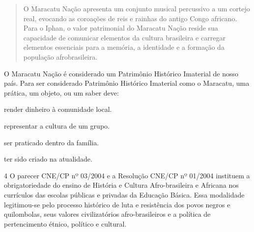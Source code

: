 \begin{quote}
O Maracatu Nação apresenta um conjunto musical percussivo a um cortejo
real, evocando as coroações de reis e rainhas do antigo Congo africano.
Para o Iphan, o valor patrimonial do Maracatu Nação reside sua
capacidade de comunicar elementos da cultura brasileira e carregar
elementos essenciais para a memória, a identidade e a formação da
população afrobrasileira.

\end{quote}

O Maracatu Nação é considerado um Patrimônio Histórico Imaterial de
nosso país. Para ser considerado Patrimônio Histórico Imaterial como o
Maracatu, uma prática, um objeto, ou um saber deve:

\begin{escolha}
\item render dinheiro à comunidade local.

\item representar a cultura de um grupo.

\item ser praticado dentro da família.

\item ter sido criado na atualidade.
\end{escolha}


\num{4} O parecer CNE/CP nº 03/2004 e a Resolução CNE/CP nº 01/2004 instituem a
obrigatoriedade do ensino de História e Cultura Afro-brasileira e
Africana nos currículos das escolas públicas e privadas da Educação
Básica. Essa modalidade legitimou-se pelo processo histórico de luta e
resistência dos povos negros e quilombolas, seus valores civilizatórios
afro-brasileiros e a política de pertencimento étnico, político e
cultural.


